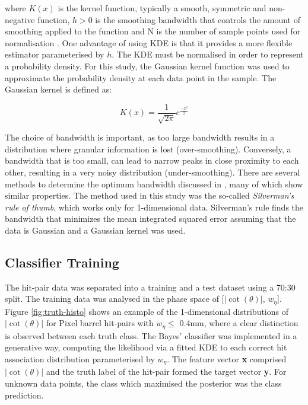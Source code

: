 where $K(x)$ is the kernel function, typically a smooth, symmetric and non-negative function, $h > 0$ is the smoothing bandwidth that controls the amount of smoothing applied to the function and N is the number of sample points used for normalisation \cite{kde}. One advantage of using KDE is that it provides a more flexible estimator parameterised by $h$. The KDE must be normalised in order to represent a probability density. For this study, the Gaussian kernel function was used to approximate the probability density at each data point in the sample. The Gaussian kernel is defined as:
    
\begin{equation} \label{eq3}
    K(x) = \frac{1}{\sqrt{2\pi}} e^{\frac{-x^2}{2}}
\end{equation}

The choice of bandwidth is important, as too large bandwidth results in a distribution where granular information is lost (over-smoothing). Conversely, a bandwidth that is too small, can lead to narrow peaks in close proximity to each other, resulting in a very noisy distribution (under-smoothing). There are several methods to determine the optimum bandwidth discussed in \cite{bandwidth-selection-methods}, many of which show similar properties. The method used in this study was the so-called \textit{Silverman's rule of thumb}, which works only for 1-dimensional data. Silverman's rule finds the bandwidth that minimizes the mean integrated squared error assuming that the data is Gaussian and a Gaussian kernel was used.

\newpage
\subsection{Classifier Training}

The hit-pair data was separated into a training and a test dataset using a 70:30 split. The training data was analysed in the phase space of [$|\cot(\theta)|$, $w_{\eta}$]. Figure \ref{fig:truth-histo} shows an example of the 1-dimensional distributions of $|\cot(\theta)|$ for Pixel barrel hit-pairs with $w_{\eta} \le$ 0.4mm, where a clear distinction is observed between each truth class. The Bayes’ classifier was implemented in a generative way, computing the likelihood via a fitted KDE to each correct hit association distribution parameterised by $w_{\eta}$. The feature vector \textbf{x} comprised $|\cot(\theta)|$ and the truth label of the hit-pair formed the target vector \textbf{y}. For unknown data points, the class which maximised the posterior was the class prediction.

